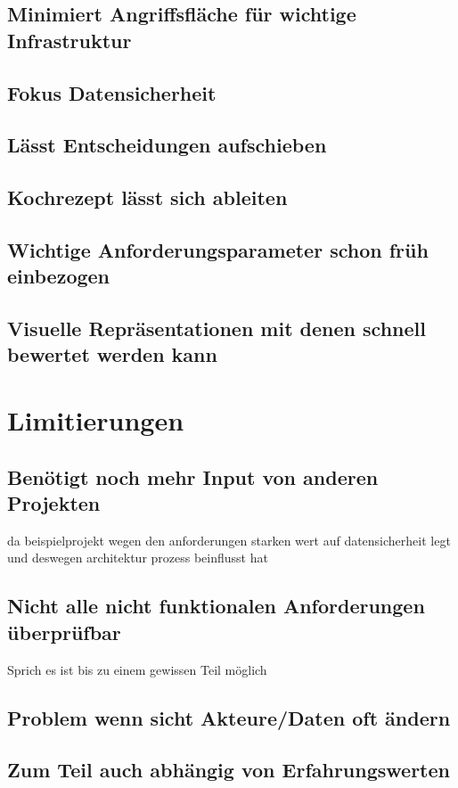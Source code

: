 \documentclass[Master,MSE,german]{twbook}
\begin{document}
\subsection{Minimiert Angriffsfläche für wichtige Infrastruktur}
\subsection{Fokus Datensicherheit}
\subsection{Lässt Entscheidungen aufschieben}
\subsection{Kochrezept lässt sich ableiten}
\subsection{Wichtige Anforderungsparameter schon früh einbezogen}
\subsection{Visuelle Repräsentationen mit denen schnell bewertet werden kann}

\section{Limitierungen}
\subsection{Benötigt noch mehr Input von anderen Projekten}
da beispielprojekt wegen den anforderungen starken wert auf datensicherheit legt und deswegen architektur prozess beinflusst hat

\subsection{Nicht alle nicht funktionalen Anforderungen überprüfbar}
Sprich es ist bis zu einem gewissen Teil möglich
\subsection{Problem wenn sicht Akteure/Daten oft ändern}
\subsection{Zum Teil auch abhängig von Erfahrungswerten}
\end{document}
